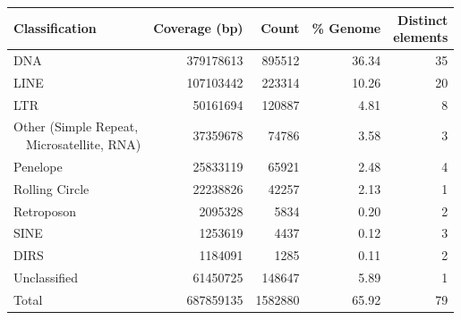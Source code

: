 \begin{table}[htbp]
\centering
{}
    \label{tab:sup_repeat_summary}
    \begin{tabular}{lrrrr}
        \toprule
            Classification &
                Coverage (bp) &
                Count &
                \% Genome &
                \shortstack{Distinct \\ elements} \\
        \midrule
            DNA                                        & \num{379178613} & \num{895512}  & 36.34 & 35 \\
            LINE                                       & \num{107103442} & \num{223314}  & 10.26 & 20 \\
            LTR                                        & \num{50161694}  & \num{120887}  &  4.81 &  8 \\
            \shortstack[l]{Other (Simple Repeat, \\
                ~~Microsatellite, RNA)}                & \num{37359678}  & \num{74786}   &  3.58 &  3 \\
            Penelope                                   & \num{25833119}  & \num{65921}   &  2.48 &  4 \\
            Rolling Circle                             & \num{22238826}  & \num{42257}   &  2.13 &  1 \\
            Retroposon                                 & \num{2095328}   & \num{5834}    &  0.20 &  2 \\
            SINE                                       & \num{1253619}   & \num{4437}    &  0.12 &  3 \\
            DIRS                                       & \num{1184091}   & \num{1285}    &  0.11 &  2 \\
            Unclassified                               & \num{61450725}  & \num{148647}  &  5.89 &  1 \\
            \midrule
            Total                                      & \num{687859135} & \num{1582880} & 65.92 & 79 \\
    \bottomrule
    \end{tabular}
\end{table}

